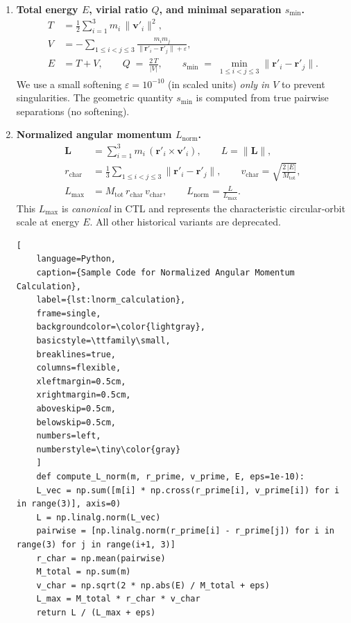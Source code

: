 \begin{enumerate}
    \item \textbf{Total energy $E$, virial ratio $Q$, and minimal separation $s_{\min}$.}
    \label{item:eqs}
    \begin{align}
    T &= \tfrac12 \sum_{i=1}^{3} m_i \,\lVert \mathbf v'_i \rVert^2, \\
    V &= - \sum_{1\le i<j\le 3} \frac{m_i m_j}{\lVert \mathbf r'_i - \mathbf r'_j \rVert + \varepsilon}, \\
    E &= T + V, \qquad
    Q \;=\; \frac{2\,T}{\lvert V \rvert}, \qquad
    s_{\min} \;=\; \min_{1\le i<j\le 3} \lVert \mathbf r'_i - \mathbf r'_j \rVert.
    \end{align}
    We use a small softening $\varepsilon = 10^{-10}$ (in scaled units) \emph{only in $V$} to
    prevent singularities. The geometric quantity $s_{\min}$ is computed from true pairwise
    separations (no softening).

    \item \textbf{Normalized angular momentum $L_{\mathrm{norm}}$.}
    \label{item:lnorm}
    \begin{align}
    \mathbf L &= \sum_{i=1}^3 m_i \,(\mathbf r'_i \times \mathbf v'_i), \qquad
    L = \lVert \mathbf L \rVert, \\
    r_{\mathrm{char}} &= \frac{1}{3} \sum_{1\le i<j\le 3} \lVert \mathbf r'_i - \mathbf r'_j \rVert, \qquad
    v_{\mathrm{char}} = \sqrt{\frac{2\,\lvert E \rvert}{M_{\mathrm{tot}}}}, \\
    L_{\max} &= M_{\mathrm{tot}} \, r_{\mathrm{char}} \, v_{\mathrm{char}}, \qquad
    L_{\mathrm{norm}} = \frac{L}{L_{\max}}.
    \end{align}
    This $L_{\max}$ is \emph{canonical} in CTL and represents the characteristic circular‐orbit
    scale at energy $E$. All other historical variants are deprecated.

    \begin{lstlisting}[
    language=Python,
    caption={Sample Code for Normalized Angular Momentum Calculation},
    label={lst:lnorm_calculation},
    frame=single,
    backgroundcolor=\color{lightgray},
    basicstyle=\ttfamily\small,
    breaklines=true,
    columns=flexible,
    xleftmargin=0.5cm,
    xrightmargin=0.5cm,
    aboveskip=0.5cm,
    belowskip=0.5cm,
    numbers=left,
    numberstyle=\tiny\color{gray}
    ]
    def compute_L_norm(m, r_prime, v_prime, E, eps=1e-10):
    L_vec = np.sum([m[i] * np.cross(r_prime[i], v_prime[i]) for i in range(3)], axis=0)
    L = np.linalg.norm(L_vec)
    pairwise = [np.linalg.norm(r_prime[i] - r_prime[j]) for i in range(3) for j in range(i+1, 3)]
    r_char = np.mean(pairwise)
    M_total = np.sum(m)
    v_char = np.sqrt(2 * np.abs(E) / M_total + eps)
    L_max = M_total * r_char * v_char
    return L / (L_max + eps)
    \end{lstlisting}



\end{enumerate}
